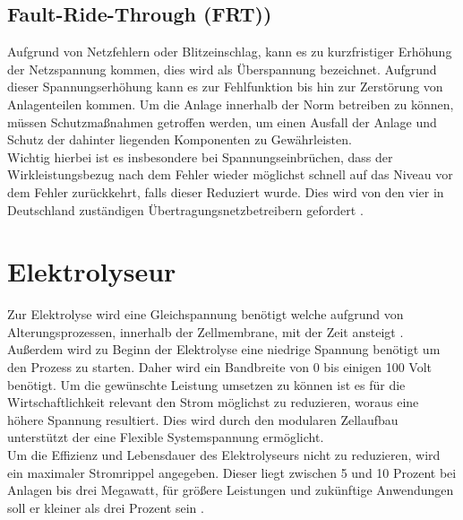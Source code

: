 	
	
	
	\subsection{Fault-Ride-Through (FRT))}
	Aufgrund von Netzfehlern oder Blitzeinschlag, kann es zu kurzfristiger Erhöhung der Netzspannung kommen, dies wird als Überspannung bezeichnet. Aufgrund dieser Spannungserhöhung kann es zur Fehlfunktion bis hin zur Zerstörung von Anlagenteilen kommen. Um die Anlage innerhalb der Norm betreiben zu können, müssen Schutzmaßnahmen getroffen werden, um einen Ausfall der Anlage und Schutz der dahinter liegenden Komponenten zu Gewährleisten.  \\
	
	Wichtig hierbei ist es insbesondere bei Spannungseinbrüchen, dass der Wirkleistungsbezug nach dem Fehler wieder möglichst schnell auf das Niveau vor dem Fehler zurückkehrt, falls dieser Reduziert wurde. Dies wird von den vier in Deutschland zuständigen Übertragungsnetzbetreibern gefordert \cite{4UNB}.


\section{Elektrolyseur}
Zur Elektrolyse wird eine Gleichspannung benötigt welche aufgrund von Alterungsprozessen, innerhalb der Zellmembrane, mit der Zeit ansteigt \cite{HydrogenElectronicTopologies}. Außerdem wird zu Beginn der Elektrolyse eine niedrige Spannung benötigt um den Prozess zu starten. Daher wird ein Bandbreite von 0 bis einigen 100 Volt benötigt. Um die gewünschte Leistung umsetzen zu können ist es für die Wirtschaftlichkeit relevant den Strom möglichst zu reduzieren, woraus eine höhere Spannung resultiert. Dies wird durch den modularen Zellaufbau unterstützt der eine Flexible Systemspannung ermöglicht. \\
Um die Effizienz und Lebensdauer des Elektrolyseurs nicht zu reduzieren, wird ein maximaler Stromrippel angegeben. Dieser liegt zwischen 5 und 10 Prozent bei Anlagen bis drei Megawatt, für größere Leistungen und zukünftige Anwendungen soll er kleiner als drei Prozent sein \cite{HydrogenRectifier}.


